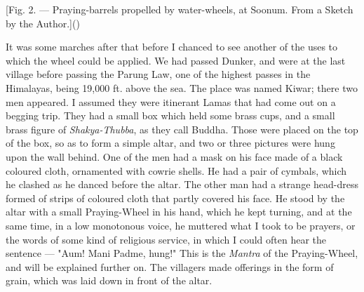 \documentclass[a4paper, 11pt, oneside, polutonikogreek, english]{article}
\begin{document}
[Fig. 2. --- Praying-barrels propelled by water-wheels, at Soonum. From a Sketch by the Author.]()

It was some marches after that before I chanced to see another of the uses to which the wheel could be applied. We had passed Dunker, and were at the last village before passing the Parung Law, one of the highest passes in the Himalayas, being 19,000 ft. above the sea. The place was named Kiwar; there two men appeared. I assumed they were itinerant Lamas that had come out on a begging trip. They had a small box which held some brass cups, and a small brass figure of \emph{Shakya-Thubba}, as they call Buddha. Those were placed on the top of the box, so as to form a simple altar, and two or three pictures were hung upon the wall behind. One of the men had a mask on his face made of a black coloured cloth, ornamented with cowrie shells. He had a pair of cymbals, which he clashed as he danced before the altar. The other man had a strange head-dress formed of strips of coloured cloth that partly covered his face. He stood by the altar with a small Praying-Wheel in his hand, which he kept turning, and at the same time, in a low monotonous voice, he muttered what I took to be prayers, or the words of some kind of religious service, in which I could often hear the sentence --- "Aum! Mani Padme, hung!" This is the \emph{Mantra} of the Praying-Wheel, and will be explained further on. The villagers made offerings in the form of grain, which was laid down in front of the altar.
\end{document}
